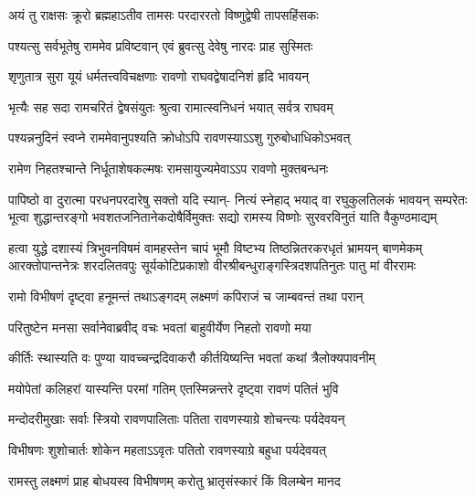 \twolineshloka
{अयं तु राक्षसः क्रूरो ब्रह्महाऽतीव तामसः}
{परदाररतो विष्णुद्वेषी तापसहिंसकः} %

\twolineshloka
{पश्यत्सु सर्वभूतेषु राममेव प्रविष्टवान्}
{एवं ब्रुवत्सु देवेषु नारदः प्राह सुस्मितः} %

\twolineshloka
{शृणुतात्र सुरा यूयं धर्मतत्त्वविचक्षणाः}
{रावणो राघवद्वेषादनिशं हृदि भावयन्} %

\twolineshloka
{भृत्यैः सह सदा रामचरितं द्वेषसंयुतः}
{श्रुत्वा रामात्स्वनिधनं भयात् सर्वत्र राघवम्} %

\twolineshloka
{पश्यन्ननुदिनं स्वप्ने राममेवानुपश्यति}
{क्रोधोऽपि रावणस्याऽऽशु गुरुबोधाधिकोऽभवत्} %

\twolineshloka
{रामेण निहतश्चान्ते निर्धूताशेषकल्मषः}
{रामसायुज्यमेवाऽऽप रावणो मुक्तबन्धनः} %

\fourlineindentedshloka
{पापिष्ठो वा दुरात्मा परधनपरदारेषु सक्तो यदि स्यान्-}
{नित्यं स्नेहाद् भयाद् वा रघुकुलतिलकं भावयन् सम्परेतः}
{भूत्वा शुद्धान्तरङ्गो भवशतजनितानेकदोषैर्विमुक्तः}
{सद्यो रामस्य विष्णोः सुरवरविनुतं याति वैकुण्ठमाद्यम्} %

\fourlineindentedshloka
{हत्वा युद्धे दशास्यं त्रिभुवनविषमं वामहस्तेन चापं}
{भूमौ विष्टभ्य तिष्ठन्नितरकरधृतं भ्रामयन् बाणमेकम्}
{आरक्तोपान्तनेत्रः शरदलितवपुः सूर्यकोटिप्रकाशो}
{वीरश्रीबन्धुराङ्गस्त्रिदशपतिनुतः पातु मां वीररामः} %






\twolineshloka
{रामो विभीषणं दृष्ट्वा हनूमन्तं तथाऽङ्गदम्}
{लक्ष्मणं कपिराजं च जाम्बवन्तं तथा परान्} %

\twolineshloka
{परितुष्टेन मनसा सर्वानेवाब्रवीद् वचः}
{भवतां बाहुवीर्येण निहतो रावणो मया} %

\twolineshloka
{कीर्तिः स्थास्यति वः पुण्या यावच्चन्द्रदिवाकरौ}
{कीर्तयिष्यन्ति भवतां कथां त्रैलोक्यपावनीम्} %

\twolineshloka
{मयोपेतां कलिहरां यास्यन्ति परमां गतिम्}
{एतस्मिन्नन्तरे दृष्ट्वा रावणं पतितं भुवि} %

\twolineshloka
{मन्दोदरीमुखाः सर्वाः स्त्रियो रावणपालिताः}
{पतिता रावणस्याग्रे शोचन्त्यः पर्यदेवयन्} %

\twolineshloka
{विभीषणः शुशोचार्तः शोकेन महताऽऽवृतः}
{पतितो रावणस्याग्रे बहुधा पर्यदेवयत्} %

\twolineshloka
{रामस्तु लक्ष्मणं प्राह बोधयस्व विभीषणम्}
{करोतु भ्रातृसंस्कारं किं विलम्बेन मानद} %

